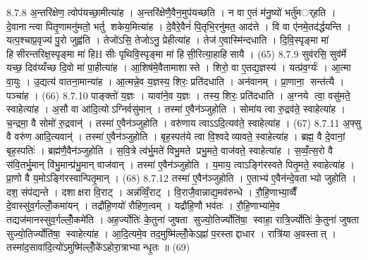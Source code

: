 8.7.8
अ॒न्तरि॑क्षेण॒ त्वोप॑यच्छा॒मीत्या॑ह । अ॒न्तरि॑क्षेणै॒वैन॒मुप॑यच्छति । न वा ए॒तं म॑नु॒ष्यो॑ भर्तु॑मर््हति । दे॒वानान्त्वा पितृ॒णामनु॑मतो॒ भर्तु शकेय॒मित्या॑ह । दे॒वैरे॒वैनं॑ पि॒तृभि॒रनु॑मत॒ आद॑त्ते । वि वा ए॑नमे॒तद॑र्द्धयन्ति । यत्प॒श्चाप्र॒वृज्य॑ पु॒रो जुह्व॑ति । तेजो॑ऽसि॒ तेजोऽनु॒ प्रेहीत्या॑ह । तेज॑ ए॒वास्मि॑न्दधाति । दि॒वि॒स्पृङ्मा मा॑ हिसीरन्तरिक्ष॒स्पृङ्मा मा॑ हिHसीः पृथिवि॒स्पृङ्मा मा॑ हिसी॒रित्या॒हाहिसायै । (65)
8.7.9
सुव॑रसि॒ सुव॑र्मे यच्छ॒ दिव॑य्यँच्छ दि॒वो मा॑ पा॒हीत्या॑ह । आ॒शिष॑मे॒वैतामाशास्ते । शिरो॒ वा ए॒तद्य॒ज्ञस्य॑ । यत्प्र॑व॒र्ग्यः॑ । आ॒त्मा वा॒युः । उ॒द्यत्य॑ वातना॒मान्या॑ह । आ॒त्मन्ने॒व य॒ज्ञस्य॒ शिरः॒ प्रति॑दधाति । अन॑वानम् । प्रा॒णाना॒ सन्त॑त्यै । पञ्चा॑ह । (66)
8.7.10
पाङ्क्तो॑ य॒ज्ञः । यावा॑ने॒व य॒ज्ञः । तस्य॒ शिरः॒ प्रति॑दधाति । अ॒ग्नये त्वा॒ वसु॑मते॒ स्वाहेत्या॑ह । अ॒सौ वा आ॑दि॒त्योऽग्निर्वसु॑मान् । तस्मा॑ ए॒वैन॑ञ्जुहोति । सोमा॑य त्वा रु॒द्रव॑ते॒ स्वाहेत्या॑ह । च॒न्द्रमा॒ वै सोमो॑ रु॒द्रवान्॑ । तस्मा॑ ए॒वैन॑ञ्जुहोति । वरु॑णाय त्वाऽऽदि॒त्यव॑ते॒ स्वाहेत्या॑ह । (67)
8.7.11
अ॒फ्सु वै वरु॑ण आदि॒त्यवान्॑ । तस्मा॑ ए॒वैन॑ञ्जुहोति । बृह॒स्पत॑ये त्वा वि॒श्वदेव्यावते॒ स्वाहेत्या॑ह । ब्रह्म॒ वै दे॒वानां॒ बृह॒स्पतिः॑ । ब्रह्म॑णै॒वैन॑ञ्जुहोति । स॒वि॒त्रे त्व॑र्भु॒मते॑ विभु॒मते प्रभु॒मते॒ वाज॑वते॒ स्वाहेत्या॑ह । स॒व्वँ॒त्स॒रो वै स॑वि॒तर्भु॒मान् वि॑भु॒मान्प्र॑भु॒मान् वाज॑वान् । तस्मा॑ ए॒वैन॑ञ्जुहोति । य॒माय॒ त्वाऽङ्गि॑रस्वते पितृ॒मते॒ स्वाहेत्या॑ह । प्रा॒णो वै य॒मोऽङ्गि॑रस्वान्पितृ॒मान् । (68)
8.7.12
तस्मा॑ ए॒वैन॑ञ्जुहोति । ए॒ताभ्य॑ ए॒वैन॑न्दे॒वताभ्यो जुहोति । दश॒ संप॑द्यन्ते । दशाक्षरा वि॒राट् । अन्न॑व्विँ॒राट् । वि॒राजै॒वान्नाद्य॒मव॑रुन्धे । रौ॒हि॒णाभ्या॒व्वैँ दे॒वास्सु॑व॒र्गल्लोँ॒कमा॑यन् । तद्रौ॑हि॒णयो॑ रौहिण॒त्वम् । यद्रौ॑हि॒णौ भव॑तः । रौ॒हि॒णाभ्या॑मे॒व तद्यज॑मानस्सुव॒र्गल्लोँ॒कमे॑ति । अह॒र्ज्योतिः॑ के॒तुना॑ जुषता सुज्यो॒तिर्ज्योति॑षा॒ स्वाहा॒ रात्रि॒र्ज्योतिः॑ के॒तुना॑ जुषता सुज्यो॒तिर्ज्योति॑षा॒ स्वाहेत्या॑ह । आ॒दि॒त्यमे॒व तद॒मुष्मि॑ल्लोँ॒केऽह्ना॑ प॒रस्ताद्दाधार । रात्रि॑या अ॒वस्तात् । तस्मा॑द॒सावा॑दि॒त्यो॑ऽमुष्मि॑ल्लोँ॒के॑ऽहोरा॒त्राभ्यान्धृ॒तः ॥ (69)
\anuvakamend

